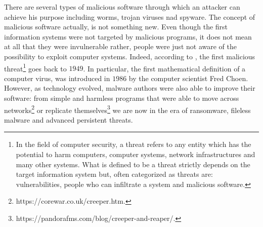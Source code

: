 \documentclass[LaM,binding=0.6cm]{sapthesis}
\begin{document}
There are several types of malicious software through which an attacker can achieve his purpose including worms, trojan viruses nad spyware. The concept of malicious software actually, is not something new\cite{Historyo87:online}. Even though the first information systems were not targeted by malicious programs, it does not mean at all that they were invulnerable rather, people were just not aware of the possibility to exploit computer systems. Indeed, according to \cite{Whendidt95:online}, the first malicious threat\footnote{In the field of computer security, a threat refers to any entity which has the potential to harm computers, computer systems, network infrastructures and many other systems. What is defined to be a threat strictly depends on the target information system but, often categorized as threats are: vulnerabilities, people who can infiltrate a system and malicious software.} goes back to $1949$. In particular, the first mathematical definition of a computer virus, was introduced in $1986$ by the computer scientist Fred Choen\cite{cohen1987computer}.\\
However, as technology evolved, malware authors were also able to improve their software: from simple and harmless programs that were able to move across networks\footnote{https://corewar.co.uk/creeper.htm.} or replicate themselves\footnote{https://pandorafms.com/blog/creeper-and-reaper/.} we are now in the era of ransomware, fileless malware\cite{alzurigrowth} 
and advanced persistent threats\cite{virvilis2013big}.\\
\end{document}
